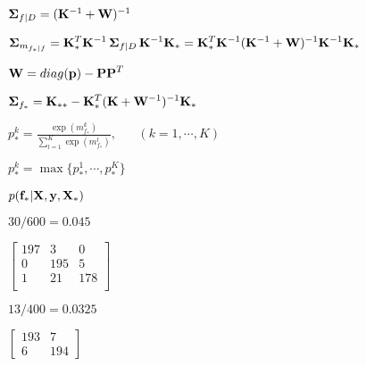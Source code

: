 \documentclass{article}
\def\lthtmlcheckvsize{\ifdim\ht\sizebox<\vsize 
  \ifdim\wd\sizebox<\hsize\expandafter\hfill\fi \expandafter\vfill
  \else\expandafter\vss\fi}%
\begin{document}
{\newpage\clearpage
{}%
$ {\bf\Sigma}_{f|D}=({\bf K}^{-1}+{\bf W})^{-1}$%
\lthtmlindisplaymathZ
\lthtmlcheckvsize\clearpage}

{\newpage\clearpage
{}%
$\displaystyle {\bf\Sigma}_{m_{f_*|f}}
={\bf K}_*^T {\bf K}^{-1}\,{\bf\Sigma}_{f|D} \,{\bf K}^{-1}{\bf K}_*
={\bf K}_*^T {\bf K}^{-1} ({\bf K}^{-1}+{\bf W})^{-1} {\bf K}^{-1}{\bf K}_*$%
\lthtmlindisplaymathZ
\lthtmlcheckvsize\clearpage}

{\newpage\clearpage
{}%
$ {\bf W}=diag({\bf p})-{\bf PP}^T$%
\lthtmlindisplaymathZ
\lthtmlcheckvsize\clearpage}

{\newpage\clearpage
{}%
$\displaystyle {\bf\Sigma}_{f_*}={\bf K}_{**}-{\bf K}_*^T({\bf K}+{\bf W}^{-1})^{-1}{\bf K}_*$%
\lthtmlindisplaymathZ
\lthtmlcheckvsize\clearpage}

{\newpage\clearpage
{}%
$\displaystyle p_*^k=\frac{\exp(m_{f_*}^k)}{\sum_{l=1}^K\exp(m_{f_*}^l)},
\;\;\;\;\;\;(k=1,\cdots,K)$%
\lthtmlindisplaymathZ
\lthtmlcheckvsize\clearpage}

{\newpage\clearpage
{}%
$ p_*^k=\max\{ p_*^1,\cdots,p_*^K \}$%
\lthtmlindisplaymathZ
\lthtmlcheckvsize\clearpage}

{\newpage\clearpage
{}%
$ p({\bf f}_*|{\bf X},{\bf y},{\bf X}_*)$%
\lthtmlindisplaymathZ
\lthtmlcheckvsize\clearpage}

{\newpage\clearpage
{}%
$ 30/600=0.045$%
\lthtmlindisplaymathZ
\lthtmlcheckvsize\clearpage}

{\newpage\clearpage
{}%
$\displaystyle \left[\begin{array}{rrr}
197 &    3 &    0   \\
0 &  195 &    5   \\
1 &   21 &  178   \\
\end{array}\right]$%
\lthtmlindisplaymathZ
\lthtmlcheckvsize\clearpage}

{\newpage\clearpage
{}%
$ 13/400=0.0325$%
\lthtmlindisplaymathZ
\lthtmlcheckvsize\clearpage}

{\newpage\clearpage
{}%
$\displaystyle \left[\begin{array}{rr}
193 &    7   \\
6 &  194
\end{array}\right]$%
\lthtmlindisplaymathZ
\lthtmlcheckvsize\clearpage}
\end{document}
